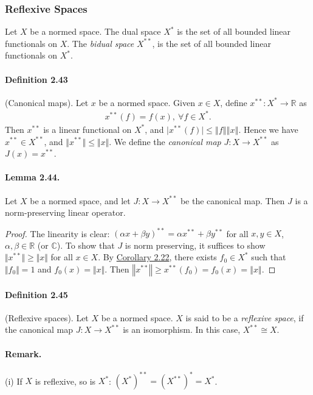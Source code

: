 \documentclass{article}
\begin{document}
\subsubsection{Reflexive Spaces}
Let $X$ be a normed space. The dual space $X^*$ is the set of all bounded linear functionals on $X$. The \textit{bidual space} $X^{**}$, is the set of all bounded linear functionals on $X^*$.
\paragraph{Definition 2.43\label{def:2.43}} (Canonical maps). Let $x$ be a normed space. Given $x\in X$, define $x^{**}: X^*\to\mathbb{R}$ as
\begin{align*}
	x^{**}(f) = f(x),\ \forall f\in X^*.
\end{align*}
Then $x^{**}$ is a linear functional on $X^*$, and $\vert x^{**}(f)\vert\leq\left\Vert f\right\Vert\left\Vert x\right\Vert$. Hence we have $x^{**}\in X^{**}$, and $\Vert x^{**}\Vert\leq\Vert x\Vert$. We define the \textit{canonical map} $J:X\to X^{**}$ as $J(x)=x^{**}$.

\paragraph{Lemma 2.44.\label{lemma:2.44}} Let $X$ be a normed space, and let $J:X\to X^{**}$ be the canonical map. Then $J$ is a norm-preserving linear operator.
\begin{proof}
The linearity is clear: $(\alpha x+\beta y)^{**}=\alpha x^{**} + \beta y^{**}$ for all $x,y\in X$, $\alpha,\beta\in\mathbb{R}$ (or $\mathbb{C}$). To show that $J$ is norm preserving, it suffices to show $\Vert x^{**}\Vert\geq\Vert x\Vert$ for all $x\in X$. By \hyperref[cor:2.22]{Corollary 2.22}, there exists $f_0\in X^*$ such that $\Vert f_0\Vert=1$ and $f_0(x)=\Vert x\Vert$. Then $\left\Vert x^{**}\right\Vert \geq x^{**}(f_0) = f_0(x) = \left\Vert x\right\Vert$.
\end{proof}

\paragraph{Definition 2.45\label{def:2.45}} (Reflexive spaces). Let $X$ be a normed space. $X$ is said to be a \textit{reflexive space}, if the canonical map $J:X\to X^{**}$ is an isomorphism. In this case, $X^{**}\cong X$.
\paragraph{Remark.} (i) If $X$ is reflexive, so is $X^*$: $(X^*)^{**} = (X^{**})^* = X^*$.
\end{document}
